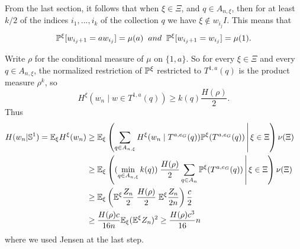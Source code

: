 From the last section, it follows that when $\xi \in \Xi$, and $q \in A_{n,\xi}$, then for at least $k/2$ of the indices $i_1,...,i_k$ of the collection $q$ we have
$\xi \notin w_{i_j} I$.
This means that 
$$\P^{\xi}[w_{i_j+1} = a w_{i_j}] = \mu(a) \;\;and\;\; \P^{\xi}[w_{i_j+1} = w_{i_j}] = \mu(1).$$

Write $\rho$ for the conditional measure of $\mu$ on $\{1,a\}$.
So for every $\xi\in \Xi$ and every $q\in A_{n,\xi}$,
the normalized restriction of $\P^{\xi}$ restricted to $T^{1,a}(q)$ is the product measure $\rho^k$, so
\[
H^\xi(w_n \mid w \in T^{1,a}(q)) \geq k(q) \frac{H(\rho)}{2}.
\] 
Thus 
	\begin{align*}
		H(w_n|\mathbb{S}^1) = \E_{\xi} H^{\xi}(w_n)& \ge \E_{\xi} \left(\sum_{q\in A_{n,\xi}}H^{\xi}(w_n\mid T^{a,e_G}(q))\P^{\xi}(T^{a,e_G}(q))\,\middle\vert\,  \xi \in \Xi \right) \nu(\Xi) & \\
        & \ge \E_{\xi} \left((\min_{q \in A_{n,\xi}} k(q))\; \frac{H(\rho)}{2} \sum_{q\in A_n}\P^{\xi}(T^{a,e_G}(q))\,\middle\vert\,  \xi \in \Xi \right) \nu(\Xi) & \\
        & \ge \E_{\xi} \left(\E^{\xi} \frac{Z_n}{2}\; \frac{H(\rho)}{2} \; \E^{\xi} \frac{Z_n}{2n}\right) \dfrac{c}{2} & \\
        & \ge \dfrac{H(\rho)c}{16n}\E_{\xi} (\E^{\xi} Z_n)^2 \ge \dfrac{H(\rho) c^3}{16} n
	\end{align*}
where we used Jensen at the last step.

